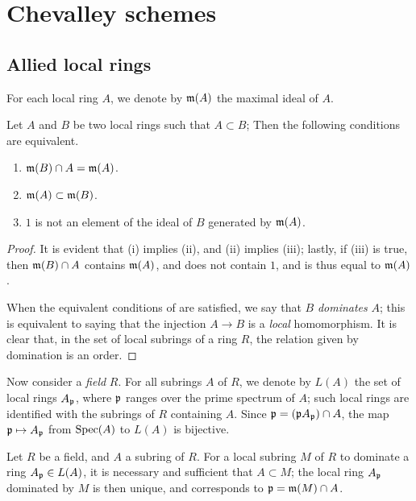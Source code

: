 \section{Chevalley schemes}
\label{section:chevalley-schemes}

\subsection{Allied local rings}
\label{subsection:allied-local-rings}

For each local ring $A$, we denote by $\mathfrak{m}(A)$ the maximal ideal of $A$.

\begin{lem}[8.1.1]
\label{1.8.1.1}
Let $A$ and $B$ be two local rings such that $A\subset B$;
Then the following conditions are equivalent.
\begin{enumerate}[label=\emph{(\roman*)}]
    \item $\mathfrak{m}(B)\cap A=\mathfrak{m}(A)$.
    \item $\mathfrak{m}(A)\subset\mathfrak{m}(B)$.
    \item $1$ is not an element of
the ideal of $B$ generated by $\mathfrak{m}(A)$.
\end{enumerate}
\end{lem}

\begin{proof}
\label{proof-1.8.1.1}
It is evident that (i) implies (ii), and (ii) implies (iii);
lastly, if (iii) is true, then $\mathfrak{m}(B)\cap A$ contains $\mathfrak{m}(A)$, and does not contain $1$, and is thus equal to $\mathfrak{m}(A)$.

When the equivalent conditions of  are satisfied, we say that $B$ \emph{dominates} $A$;
this is equivalent to saying that the injection $A\to B$ is a \emph{local} homomorphism.
It is clear that, in the set of local subrings of a ring $R$, the relation given by domination is an order.
\end{proof}

\begin{env}[8.1.2]
\label{1.8.1.2}
Now consider a \emph{field} $R$.
For all subrings $A$ of $R$, we denote by $L(A)$ the set of local rings $A_\mathfrak{p}$, where $\mathfrak{p}$ ranges over the prime spectrum of $A$;
such local rings are identified with the subrings of $R$ containing $A$.
Since $\mathfrak{p}=(\mathfrak{p}A_\mathfrak{p})\cap A$, the map $\fk{p}\mapsto A_\fk{p}$ from ${\mathop{\mathrm{Spec}}\nolimits}(A)$ to $L(A)$ is bijective.
\end{env}

\begin{lem}[8.1.3]
\label{1.8.1.3}
Let $R$ be a field, and $A$ a subring of $R$.
For a local subring $M$ of $R$ to dominate a ring $A_\mathfrak{p}\in L(A)$, it is necessary and sufficient that $A\subset M$;
the local ring $A_\mathfrak{p}$ dominated by $M$ is then unique, and corresponds to $\mathfrak{p}=\mathfrak{m}(M)\cap A$.
\end{lem}

